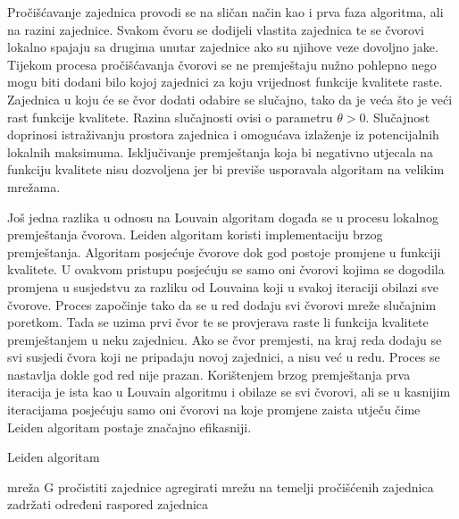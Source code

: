 \documentclass[times, utf8, diplomski]{fer}
\begin{document}
Pročišćavanje zajednica provodi se na sličan način kao i prva faza algoritma, ali na razini zajednice. Svakom čvoru se dodijeli vlastita zajednica te se čvorovi lokalno spajaju sa drugima unutar zajednice ako su njihove veze dovoljno jake. Tijekom procesa pročišćavanja čvorovi se ne premještaju nužno pohlepno nego mogu biti dodani bilo kojoj zajednici za koju vrijednost funkcije kvalitete raste. Zajednica u koju će se čvor dodati odabire se slučajno, tako da je veća što je veći rast funkcije kvalitete. Razina slučajnosti ovisi o parametru $\theta > 0$. Slučajnost doprinosi istraživanju prostora zajednica i omogućava izlaženje iz potencijalnih lokalnih maksimuma. Isključivanje premještanja koja bi negativno utjecala na funkciju kvalitete nisu dozvoljena jer bi previše usporavala algoritam na velikim mrežama. 


Još jedna razlika u odnosu na Louvain algoritam događa se u procesu lokalnog premještanja čvorova. Leiden algoritam koristi implementaciju brzog premještanja. Algoritam posjećuje čvorove dok god postoje promjene u funkciji kvalitete. U ovakvom pristupu posjećuju se samo oni čvorovi kojima se dogodila promjena u susjedstvu za razliku od Louvaina koji u svakoj iteraciji obilazi sve čvorove. Proces započinje tako da se u red dodaju svi čvorovi mreže slučajnim poretkom. Tada se uzima prvi čvor te se provjerava raste li funkcija kvalitete premještanjem u neku zajednicu. Ako se čvor premjesti, na kraj reda dodaju se svi susjedi čvora koji ne pripadaju novoj zajednici, a nisu već u redu. Proces se nastavlja dokle god red nije prazan. Korištenjem brzog premještanja prva iteracija je ista kao u Louvain algoritmu i obilaze se svi čvorovi, ali se u kasnijim iteracijama posjećuju samo oni čvorovi na koje promjene zaista utječu čime Leiden algoritam postaje značajno efikasniji.


\begin{algorithm}
	\caption{Leiden algoritam}
	\begin{algorithmic}[1]
		\REQUIRE mreža G
		\REPEAT 
		\ELSE
		\STATE pročistiti zajednice
		\STATE agregirati mrežu na temelji pročišćenih zajednica
		\STATE zadržati određeni raspored zajednica 
		\ENDIF
		\UNTIL		
	\end{algorithmic}
\end{algorithm}
\end{document}
